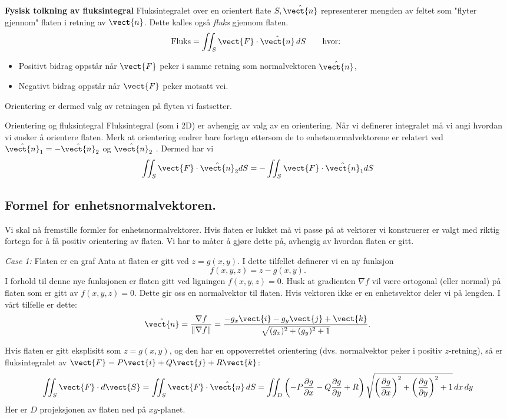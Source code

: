 \textbf{Fysisk tolkning av fluksintegral} Fluksintegralet over en orientert flate $S, \hat{\vect{n}}$ representerer mengden av feltet som "flyter gjennom" flaten i retning av $\vect{n}$. Dette kalles også \emph{fluks} gjennom flaten.
\[
\text{Fluks} = \iint_S \vect{F} \cdot \hat{\vect{n}}\, dS \qquad \text{hvor: }
\]
\begin{itemize}
\item Positivt bidrag oppstår når \( \vect{F} \) peker i samme retning som normalvektoren $\hat{\vect{n}}$,
\item Negativt bidrag oppstår når \( \vect{F} \) peker motsatt vei.
\end{itemize}
Orientering er dermed valg av retningen på flyten vi fastsetter. 
%
\begin{rem}{Orientering og fluksintegral}
Fluksintegral (som i 2D) er avhengig av valg av en orientering. Når vi definerer integralet må vi angi hvordan vi ønsker å orientere flaten. Merk at orientering endrer bare fortegn ettersom de to enhetsnormalvektorene er relatert ved $\hat{\vect{n}}_1=-\hat{\vect{n}}_2$ og $\hat{\vect{n}}_2$ . Dermed har vi 
\[\iint_S \vect{F} \cdot \hat{\vect{n}}_2 dS = -\iint_S \vect{F} \cdot \hat{\vect{n}}_1 dS \]
\end{rem}

%
\subsection*{Formel for enhetsnormalvektoren.} Vi skal nå fremstille formler for enhetsnormalvektorer. 
Hvis flaten er lukket må vi passe på at vektorer vi konstruerer er valgt med riktig fortegn for å få positiv orientering av flaten. 
Vi har to måter å gjøre dette på, avhengig av hvordan flaten er gitt.

\begin{oppsum}{\emph{Case 1:} Flaten er en graf} Anta at flaten er gitt ved $z = g(x, y)$. I dette tilfellet definerer vi en ny funksjon
\[
f(x, y, z) = z - g(x, y).
\]
I forhold til denne nye funksjonen er flaten gitt ved ligningen $f(x, y, z) = 0$. Husk at gradienten $\nabla f$ vil være ortogonal (eller normal) på flaten som er gitt av $f(x, y, z) = 0$. Dette gir oss en normalvektor til flaten. Hvis vektoren ikke er en enhetsvektor deler vi på lengden. I vårt tilfelle er dette:
\[
\hat{\vect{n}} = \frac{\nabla f}{\|\nabla f\|} = \frac{-g_x \vect{i} - g_y \vect{j} + \vect{k}}{\sqrt{(g_x)^2 + (g_y)^2 + 1}}.
\]

Hvis flaten er gitt eksplisitt som \( z = g(x, y) \), og den har en oppoverrettet orientering (dvs. normalvektor peker i positiv \( z \)-retning), så er fluksintegralet av $\vect{F}=P\vect{i}+Q\vect{j}+R\vect{k}$:
\[
\iint_S \vect{F}\cdot d\vect{S}=\iint_S \vect{F} \cdot \hat{\vect{n}}\, dS = \iint_D \left( -P \frac{\partial g}{\partial x} - Q \frac{\partial g}{\partial y} + R \right) \sqrt{ \left( \frac{\partial g}{\partial x} \right)^2 + \left( \frac{\partial g}{\partial y} \right)^2 + 1 }\, dx\, dy
\]
Her er \( D \) projeksjonen av flaten ned på \( xy \)-planet.
\end{oppsum}

